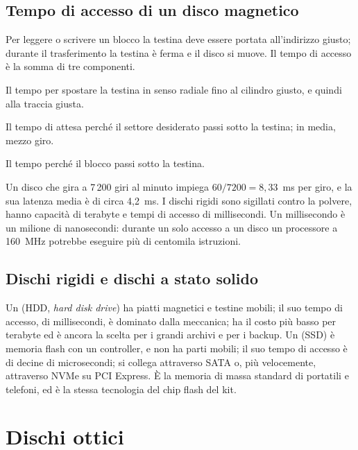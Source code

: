 \subsection{Tempo di accesso di un disco magnetico}

Per leggere o scrivere un blocco la testina deve essere portata all'indirizzo
giusto; durante il trasferimento la testina è ferma e il disco si muove. Il
tempo di accesso è la somma di tre componenti.

\begin{description}[style=nextline,leftmargin=1.5em]
\item[Tempo di posizionamento.] Il tempo per spostare la testina in senso
  radiale fino al cilindro giusto, e quindi alla traccia giusta.
\item[Tempo di latenza.] Il tempo di attesa perché il settore desiderato passi
  sotto la testina; in media, mezzo giro.
\item[Tempo di trasferimento.] Il tempo perché il blocco passi sotto la
  testina.
\end{description}

Un disco che gira a 7\,200 giri al minuto impiega $60/7200 = 8,33$~ms per
giro, e la sua latenza media è di circa 4,2~ms. I dischi rigidi sono sigillati
contro la polvere, hanno capacità di terabyte e tempi di accesso di
millisecondi. Un millisecondo è un milione di nanosecondi: durante un solo
accesso a un disco un processore a 160~MHz potrebbe eseguire più di centomila
istruzioni.

\subsection{Dischi rigidi e dischi a stato solido}

Un  (HDD, \emph{hard disk drive}) ha piatti magnetici e
testine mobili; il suo tempo di accesso, di millisecondi, è dominato dalla
meccanica; ha il costo più basso per terabyte ed è ancora la scelta per i
grandi archivi e per i backup. Un  (SSD) è memoria
flash con un controller, e non ha parti mobili; il suo tempo di accesso è di
decine di microsecondi; si collega attraverso SATA o, più velocemente,
attraverso NVMe su PCI Express. È la memoria di massa standard di portatili e
telefoni, ed è la stessa tecnologia del chip flash del kit.

\section{Dischi ottici}

